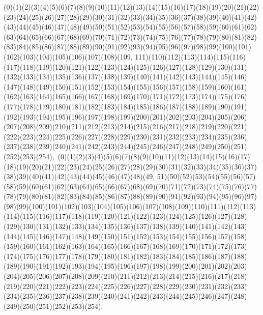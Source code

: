 \documentclass[12pt]{article}
\begin{document}
{(0)(1)(2)(3)(4)(5)(6)(7)(8)(9)(10)(11)(12)(13)(14)(15)(16)(17)(18)(19)(20)(21)(22)(23)(24)(25)(26)(27)(28)(29)(30)(31)(32)(33)(34)(35)(36)(37)(38)(39)(40)(41)(42)(43)(44)(45)(46)(47)(48)(49)(50)(51)(52)(53)(54)(55)(56)(57)(58)(59)(60)(61)(62)(63)(64)(65)(66)(67)(68)(69)(70)(71)(72)(73)(74)(75)(76)(77)(78)(79)(80)(81)(82)(83)(84)(85)(86)(87)(88)(89)(90)(91)(92)(93)(94)(95)(96)(97)(98)(99)(100)(101)(102)(103)(104)(105)(106)(107)(108)(109, 111)(110)(112)(113)(114)(115)(116)(117)(118)(119)(120)(121)(122)(123)(124)(125)(126)(127)(128)(129)(130)(131)(132)(133)(134)(135)(136)(137)(138)(139)(140)(141)(142)(143)(144)(145)(146)(147)(148)(149)(150)(151)(152)(153)(154)(155)(156)(157)(158)(159)(160)(161)(162)(163)(164)(165)(166)(167)(168)(169)(170)(171)(172)(173)(174)(175)(176)(177)(178)(179)(180)(181)(182)(183)(184)(185)(186)(187)(188)(189)(190)(191)(192)(193)(194)(195)(196)(197)(198)(199)(200)(201)(202)(203)(204)(205)(206)(207)(208)(209)(210)(211)(212)(213)(214)(215)(216)(217)(218)(219)(220)(221)(222)(223)(224)(225)(226)(227)(228)(229)(230)(231)(232)(233)(234)(235)(236)(237)(238)(239)(240)(241)(242)(243)(244)(245)(246)(247)(248)(249)(250)(251)(252)(253)(254)$
, 
$
(0)(1)(2)(3)(4)(5)(6)(7)(8)(9)(10)(11)(12)(13)(14)(15)(16)(17)(18)(19)(20)(21)(22)(23)(24)(25)(26)(27)(28)(29)(30)(31)(32)(33)(34)(35)(36)(37)(38)(39)(40)(41)(42)(43)(44)(45)(46)(47)(48)(49, 51)(50)(52)(53)(54)(55)(56)(57)(58)(59)(60)(61)(62)(63)(64)(65)(66)(67)(68)(69)(70)(71)(72)(73)(74)(75)(76)(77)(78)(79)(80)(81)(82)(83)(84)(85)(86)(87)(88)(89)(90)(91)(92)(93)(94)(95)(96)(97)(98)(99)(100)(101)(102)(103)(104)(105)(106)(107)(108)(109)(110)(111)(112)(113)(114)(115)(116)(117)(118)(119)(120)(121)(122)(123)(124)(125)(126)(127)(128)(129)(130)(131)(132)(133)(134)(135)(136)(137)(138)(139)(140)(141)(142)(143)(144)(145)(146)(147)(148)(149)(150)(151)(152)(153)(154)(155)(156)(157)(158)(159)(160)(161)(162)(163)(164)(165)(166)(167)(168)(169)(170)(171)(172)(173)(174)(175)(176)(177)(178)(179)(180)(181)(182)(183)(184)(185)(186)(187)(188)(189)(190)(191)(192)(193)(194)(195)(196)(197)(198)(199)(200)(201)(202)(203)(204)(205)(206)(207)(208)(209)(210)(211)(212)(213)(214)(215)(216)(217)(218)(219)(220)(221)(222)(223)(224)(225)(226)(227)(228)(229)(230)(231)(232)(233)(234)(235)(236)(237)(238)(239)(240)(241)(242)(243)(244)(245)(246)(247)(248)(249)(250)(251)(252)(253)(254)$
, 
$
}
\end{document}
